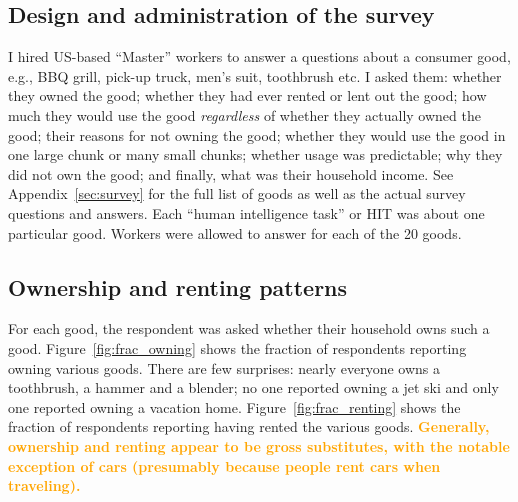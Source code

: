 \documentclass[11pt]{article}
\newcommand{\important}[1]{\textcolor{orange}{\textbf{#1}}}
\newcommand{\important}[1]{#1}
\begin{document}
\subsection{Design and administration of the survey}
I hired US-based ``Master'' workers to answer a questions about a consumer good, e.g., BBQ grill, pick-up truck, men's suit, toothbrush etc.
I asked them: whether they owned the good; whether they had ever rented or lent out the good; how much they would use the good \emph{regardless} of whether they actually owned the good; their reasons for not owning the good; whether they would use the good in one large chunk or many small chunks; whether usage was predictable; why they did not own the good; and finally, what was their household income. 
See Appendix~\ref{sec:survey} for the full list of goods as well as the actual survey questions and answers.  
Each ``human intelligence task'' or HIT was about one particular good. 
Workers were allowed to answer for each of the 20 goods.  
 
\subsection{Ownership and renting patterns} 
For each good, the respondent was asked whether their household owns such a good. 
Figure~\ref{fig:frac_owning} shows the fraction of respondents reporting owning various goods.  
There are few surprises: nearly everyone owns a toothbrush, a hammer and a blender; no one reported owning a jet ski and only one reported owning a vacation home.
Figure~\ref{fig:frac_renting} shows the fraction of respondents reporting having rented the various goods. 
\important{Generally, ownership and renting appear to be gross substitutes, with the notable exception of cars (presumably because people rent cars when traveling).}
\end{document}
